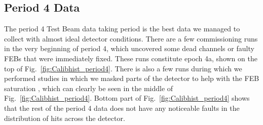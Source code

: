 \FloatBarrier
\subsection{Period 4 Data}\label{sec:TBPeriod4}

The period 4 Test Beam data taking period is the best data we managed to collect with almost ideal detector conditions. There are a few commissioning runs in the very beginning of period 4, which uncovered some dead channels or faulty \gls{FEB}s that were immediately fixed. These runs constitute epoch 4a, shown on the top of Fig.~\ref{fig:Calibhist_period4}. There is also a few runs during which we performed studies in which we masked parts of the detector to help with the \gls{FEB} saturation \cite{NOvA-doc-53658}, which can clearly be seen in the middle of Fig.~\ref{fig:Calibhist_period4}. Bottom part of Fig.~\ref{fig:Calibhist_period4} shows that the rest of the period 4 data does not have any noticeable faults in the distribution of hits across the detector.

